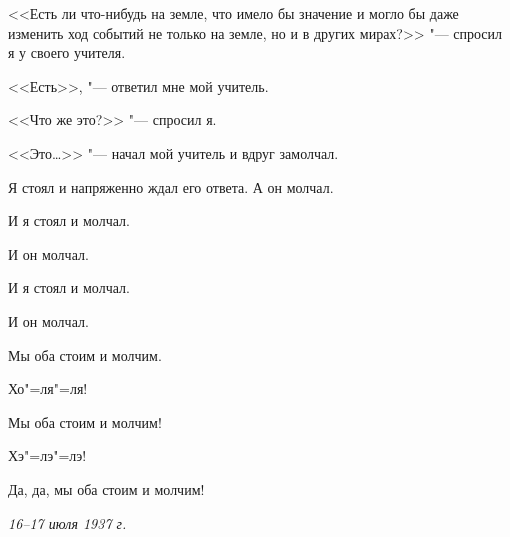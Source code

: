 <<Есть ли что-нибудь на земле, что имело бы значение и могло бы даже изменить ход событий не только на земле, но и в других мирах?>> "--- спросил я у своего учителя.

<<Есть>>, "--- ответил мне мой учитель.

<<Что же это?>> "--- спросил я.

<<Это\dots>> "--- начал мой учитель и вдруг замолчал.

Я стоял и напряженно ждал его ответа. А он молчал.

И я стоял и молчал.

И он молчал.

И я стоял и молчал.

И он молчал.

Мы оба стоим и молчим.

Хо"=ля"=ля!

Мы оба стоим и молчим!

Хэ"=лэ"=лэ!

Да, да, мы оба стоим и молчим!

\medskip
\noindent\textit{16--17 июля 1937 г.}
